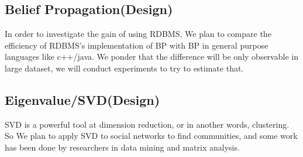 \subsection{Belief Propagation(Design)}
In order to investigate the gain of using RDBMS, We plan to compare the efficiency of RDBMS's implementation of BP with BP in general purpose languages like c++/java. We ponder that the difference will be only observable in large dataset, we will conduct experiments to try to estimate that. 

\subsection{Eigenvalue/SVD(Design)}
SVD is a powerful tool at dimension reduction, or in another words, clustering. So We plan to apply SVD to social networks to find communities, and some work has been done by researchers in data mining and matrix analysis. 

